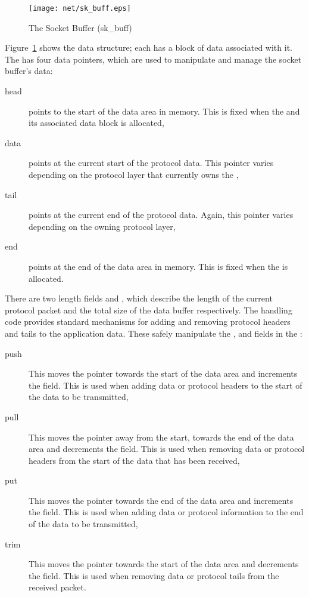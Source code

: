 \begin{figure}
\begin{center}
{\centering \texttt{[image: net/sk\_buff.eps]} \par}
\end{center}
\caption{The Socket Buffer (sk\_buff)}
\label{skbuff-figure}
\end{figure}
Figure~\ref{skbuff-figure} shows the  data structure;
each  has a block of data associated with it.
The  has four data pointers, which are used to manipulate and manage the socket buffer's
data:
\begin{description}
	\item [head] points to the start of the data area in memory.  This is fixed when the
		 and its associated data block is allocated,
	\item [data] points at the current start of the protocol data.  This pointer varies depending 
		on the protocol layer that currently owns the ,
	\item [tail] points at the current end of the protocol data.  Again, this pointer 
		varies depending on the owning protocol layer,
	\item [end] points at the end of the data area in memory.  This is fixed when the  
		is allocated.
\end{description}
There are two length fields  and , which describe the length of the 
current protocol packet and the total size of the data buffer respectively.
The  handling code provides standard mechanisms for adding and removing protocol headers
and tails to the application data.
These safely manipulate the ,  and  fields in the :
\begin{description}
	\item [push] This moves the  pointer towards the start of the data area and 
		increments the  field.  This is used when adding data or protocol headers
		to the start of the data to be transmitted,
	\item [pull] This moves the  pointer away from the start, towards the end of
		the data area and decrements the  field.
		This is used when removing data or protocol headers from the start of the data
		that has been received,
	\item [put] This moves the  pointer towards the end of the data area and increments
		the  field.  This is used when adding data or protocol information to the 
		end of the data to be transmitted,
	\item [trim] This moves the  pointer towards the start of the data area and 
		decrements the  field.
		This is used when removing data or protocol tails from the received packet.
\end{description}

